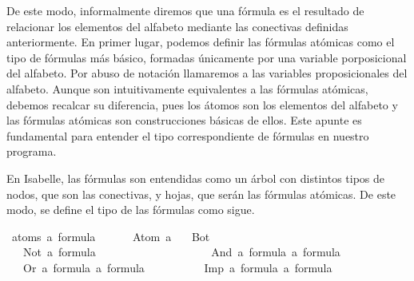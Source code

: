 \begin{isabellebody}
\begin{isamarkuptext}
De este modo, informalmente diremos que una fórmula es el resultado de relacionar los elementos del 
alfabeto mediante las conectivas definidas anteriormente. En primer lugar, podemos definir las 
fórmulas atómicas como el tipo de fórmulas más básico, formadas únicamente por una variable 
porposicional del alfabeto. Por abuso de notación llamaremos  a las variables 
proposicionales del alfabeto. Aunque son intuitivamente equivalentes a las fórmulas atómicas, 
debemos recalcar su diferencia, pues los átomos son los elementos del alfabeto y las fórmulas 
atómicas son construcciones básicas de ellos. Este apunte es fundamental para entender el tipo 
correspondiente de fórmulas en nuestro programa.%
\end{isamarkuptext}\isamarkuptrue%
%
\begin{isamarkuptext}%
En Isabelle, las fórmulas son entendidas como un árbol con distintos tipos de nodos, que
son las conectivas, y hojas, que serán las fórmulas atómicas. De este modo, se define el tipo de 
las fórmulas como sigue.%
\end{isamarkuptext}\isamarkuptrue%
\isamarkupfalse%
\ {\isacharparenleft}atoms{\isacharcolon}\ {\isacharprime}a{\isacharparenright}\ formula\ {\isacharequal}\ \isanewline
\ \ \ \ Atom\ {\isacharprime}a\isanewline
\ \ {\isacharbar}\ Bot\ \ \ \ \ \ \ \ \ \ \ \ \ \ \ \ \ \ \ \ \ \ \ \ \ \ \ \ \ \ {\isacharparenleft}{\isachardoublequoteopen}{\isasymbottom}{\isachardoublequoteclose}{\isacharparenright}\ \ \isanewline
\ \ {\isacharbar}\ Not\ {\isachardoublequoteopen}{\isacharprime}a\ formula{\isachardoublequoteclose}\ \ \ \ \ \ \ \ \ \ \ \ \ \ \ \ \ {\isacharparenleft}{\isachardoublequoteopen}\isactrlbold {\isasymnot}{\isachardoublequoteclose}{\isacharparenright}\isanewline
\ \ {\isacharbar}\ And\ {\isachardoublequoteopen}{\isacharprime}a\ formula{\isachardoublequoteclose}\ {\isachardoublequoteopen}{\isacharprime}a\ formula{\isachardoublequoteclose}\ \ \ \ {\isacharparenleft}\ {\isachardoublequoteopen}\isactrlbold {\isasymand}{\isachardoublequoteclose}\ {}{}{\isacharparenright}\isanewline
\ \ {\isacharbar}\ Or\ {\isachardoublequoteopen}{\isacharprime}a\ formula{\isachardoublequoteclose}\ {\isachardoublequoteopen}{\isacharprime}a\ formula{\isachardoublequoteclose}\ \ \ \ \ {\isacharparenleft}\ {\isachardoublequoteopen}\isactrlbold {\isasymor}{\isachardoublequoteclose}\ {}{}{\isacharparenright}\isanewline
\ \ {\isacharbar}\ Imp\ {\isachardoublequoteopen}{\isacharprime}a\ formula{\isachardoublequoteclose}\ {\isachardoublequoteopen}{\isacharprime}a\ formula{\isachardoublequoteclose}\ \ \ \ {\isacharparenleft}\ {\isachardoublequoteopen}\isactrlbold {\isasymrightarrow}{\isachardoublequoteclose}\ {}{}{\isacharparenright}%

\end{isabellebody}
